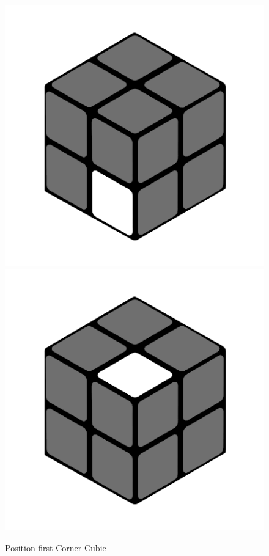 \documentclass[12pt,a4paper]{article}
\theoremstyle{custom}
\begin{document}
\begin{figure}[H]
\centering
\includegraphics[scale=0.12]{e1_s1_s1.png}
\includegraphics[scale=0.12]{e1_s1_s2.png}
\caption{Position first Corner Cubie}
\label{Figure_FirstCornercubie}
\end{figure}
\end{document}
